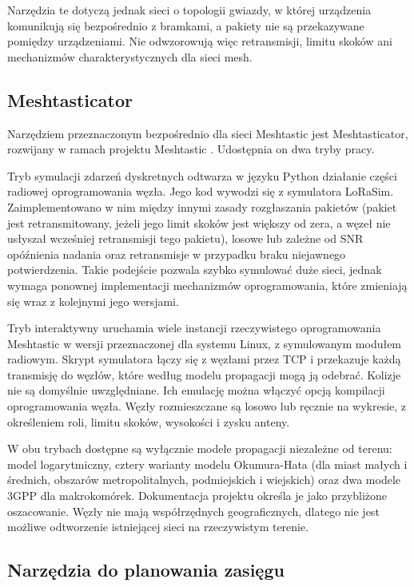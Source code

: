 \documentclass[12pt,a4paper,twoside]{report}
\theoremstyle{definition} %
\begin{document}
Narzędzia te dotyczą jednak sieci o topologii gwiazdy, w której urządzenia komunikują się bezpośrednio z bramkami, a pakiety nie są przekazywane pomiędzy urządzeniami. Nie odwzorowują więc retransmisji, limitu skoków ani mechanizmów charakterystycznych dla sieci mesh.

\subsection{Meshtasticator}

Narzędziem przeznaczonym bezpośrednio dla sieci Meshtastic jest Meshtasticator, rozwijany w ramach projektu Meshtastic \cite{meshtasticator}. Udostępnia on dwa tryby pracy.

Tryb symulacji zdarzeń dyskretnych odtwarza w języku Python działanie części radiowej oprogramowania węzła. Jego kod wywodzi się z symulatora LoRaSim. Zaimplementowano w nim między innymi zasady rozgłaszania pakietów (pakiet jest retransmitowany, jeżeli jego limit skoków jest większy od zera, a węzeł nie usłyszał wcześniej retransmisji tego pakietu), losowe lub zależne od SNR opóźnienia nadania oraz retransmisje w przypadku braku niejawnego potwierdzenia. Takie podejście pozwala szybko symulować duże sieci, jednak wymaga ponownej implementacji mechanizmów oprogramowania, które zmieniają się wraz z kolejnymi jego wersjami.

Tryb interaktywny uruchamia wiele instancji rzeczywistego oprogramowania Meshtastic w wersji przeznaczonej dla systemu Linux, z symulowanym modułem radiowym. Skrypt symulatora łączy się z węzłami przez TCP i przekazuje każdą transmisję do węzłów, które według modelu propagacji mogą ją odebrać. Kolizje nie są domyślnie uwzględniane. Ich emulację można włączyć opcją kompilacji oprogramowania węzła. Węzły rozmieszczane są losowo lub ręcznie na wykresie, z określeniem roli, limitu skoków, wysokości i zysku anteny.

W obu trybach dostępne są wyłącznie modele propagacji niezależne od terenu: model logarytmiczny, cztery warianty modelu Okumura-Hata (dla miast małych i średnich, obszarów metropolitalnych, podmiejskich i wiejskich) oraz dwa modele 3GPP dla makrokomórek. Dokumentacja projektu określa je jako przybliżone oszacowanie. Węzły nie mają współrzędnych geograficznych, dlatego nie jest możliwe odtworzenie istniejącej sieci na rzeczywistym terenie.

\subsection{Narzędzia do planowania zasięgu}
\end{document}
